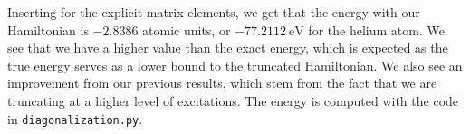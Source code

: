 

Inserting for the explicit matrix elements, we get that the energy with our Hamiltonian is $-2.8386$ atomic units, or $-77.2112 \ \text{eV}$ for the helium atom.
We see that we have a higher value than the exact energy, which is expected as the true energy serves as a lower bound to the truncated Hamiltonian.
We also see an improvement from our previous results, which stem from the fact that we are truncating at a higher level of excitations.
The energy is computed with the code in \verb|diagonalization.py|.
